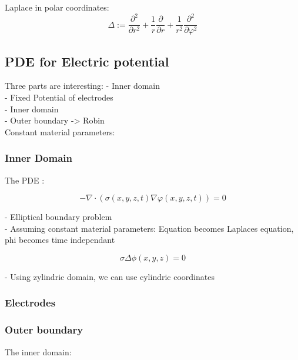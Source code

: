 \documentclass[parskip=half, titlepage=yes, 12pt, BCOR=12mm, DIV=calc]{scrartcl}
\begin{document}
Laplace in polar coordinates:
\begin{equation}
    \Delta := \frac{\partial^2}{\partial r^2} + \frac{1}{r} \frac{\partial}{\partial r} + \frac{1}{r^2} \frac{\partial^2}{\partial \varphi^2}
\end{equation}




\subsection{PDE for Electric potential}

Three parts are interesting:
- Inner domain \\
- Fixed Potential of electrodes \\
- Inner domain \\
- Outer boundary -> Robin \\

Constant material parameters: \\

\subsubsection{Inner Domain}

The PDE : 

\begin{equation}
    - \nabla \cdot (\sigma(x,y,z,t) \nabla \varphi(x,y,z,t)) = 0
\end{equation}

- Elliptical boundary problem \\
- Assuming constant material parameters: Equation becomes Laplaces equation, phi becomes time independant

\begin{equation}
    \sigma \Delta \phi(x,y,z) = 0
\end{equation}

- Using zylindric domain, we can use cylindric coordinates



\subsubsection{Electrodes}

\subsubsection{Outer boundary}

The inner domain: 
\begin{equation}
    
\end{equation}
\end{document}
